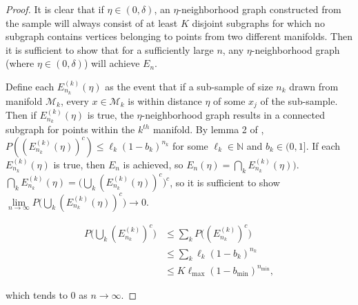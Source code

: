 \documentclass[
  12pt,
]{article}
\theoremstyle{definition}
\theoremstyle{definition}
\theoremstyle{definition}
\theoremstyle{definition}
\theoremstyle{remark}
\begin{document}
\begin{proof}
It is clear that if $\eta \in (0, \delta)$, an $\eta$-neighborhood graph constructed from the sample will always consist of at least $K$ disjoint subgraphs for which no subgraph contains vertices belonging to points from two different manifolds. 
Then it is sufficient to show that for a sufficiently large $n$, any $\eta$-neighborhood graph (where $\eta \in (0, \delta)$) will achieve $E_n$. 

Define each $E_{n_k}^{(k)}(\eta)$ as the event that if a sub-sample of size $n_k$ drawn from manifold $\mathcal{M}_k$, every $x \in \mathcal{M}_k$ is within distance $\eta$ of some $x_j$ of the sub-sample. 
Then if $E_{n_k}^{(k)}(\eta)$ is true, the $\eta$-neighborhood graph results in a connected subgraph for points within the $k^{th}$ manifold. 
By lemma 2 of \citet{trosset2020rehabilitating}, $P((E_{n_k}^{(k)}(\eta))^c) \leq \ell_k (1 - b_k)^{n_k}$ for some $\ell_k \in \mathbb{N}$ and $b_k \in (0, 1]$. 
If each $E_{n_k}^{(k)}(\eta)$ is true, then $E_n$ is achieved, so $E_n(\eta) = \bigcap_k E_{n_k}^{(k)}(\eta))$. 
$\bigcap_k E_{n_k}^{(k)}(\eta) = \Big( \bigcup_k (E_{n_k}^{(k)}(\eta))^c \Big)^c$, so it is sufficient to show $\lim\limits_{n \to \infty} P \big( \bigcup_k (E_{n_k}^{(k)}(\eta))^c \big) \to 0$. 

$$
\begin{aligned}
P \big( \bigcup_k(E_{n_k}^{(k)})^c \big) & \leq \sum_k P \big((E_{n_k}^{(k)})^c \big) \\
& \leq \sum_k \ell_k (1 - b_k)^{n_k} \\
& \leq K \ell_{\max} (1 - b_{\min})^{n_{\min}},
\end{aligned}
$$

which tends to $0$ as $n \to \infty$. 
\end{proof}
\end{document}
